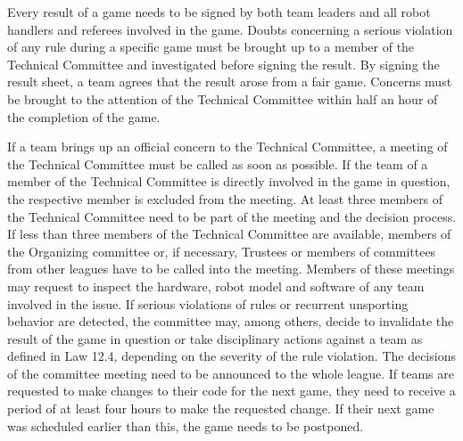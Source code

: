 Every result of a game needs to be signed by both team leaders and all robot handlers and referees involved in the game. Doubts concerning a serious violation of any rule during a specific game must be brought up to a member of the Technical Committee and investigated before signing the result. By signing the result sheet, a team agrees that the result arose from a fair game. Concerns must be brought to the attention of the Technical Committee within half an hour of the completion of the game. 

If a team brings up an official concern to the Technical Committee, a meeting of the Technical Committee must be called as soon as possible. If the team of a member of the Technical Committee is	directly involved in the game in question, the respective member is excluded from the meeting. At least three members	of the Technical Committee need to be part of the meeting and the decision process. If less than three members of the Technical Committee are available, members of the Organizing committee or, if necessary, Trustees or members of committees from other leagues have to be called into the meeting. Members of these meetings may request to inspect the hardware, robot model and software of any team involved in the issue. If serious violations of rules or recurrent unsporting behavior are detected, the committee may, among others, decide to invalidate the result of the game in question or take disciplinary actions against a team as defined in Law 12.4, depending on the severity of the rule violation. The decisions of the committee meeting need to be announced to the whole league. If teams are requested to make changes to their code for the next game, they need to receive a period of at least four hours to make the requested change. If their next game was scheduled earlier than this, the game needs to be postponed.
